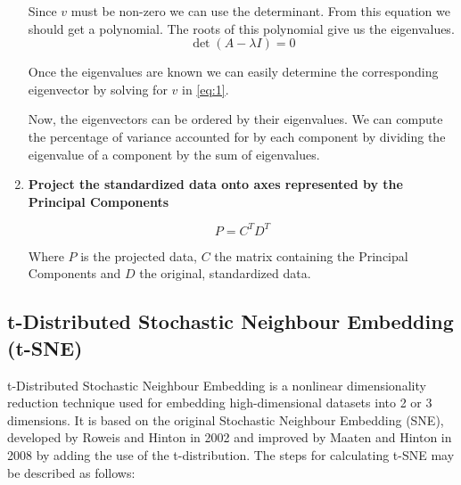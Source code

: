\documentclass[a4paper, 12pt, twoside]{report}
\begin{document}
\begin{enumerate}
    Since $v$ must be non-zero we can use the determinant. From this equation we should get a polynomial. The roots of this polynomial give us the eigenvalues.
    \[ \det(A - \lambda I) = 0 \]

    Once the eigenvalues are known we can easily determine the corresponding eigenvector by solving for $v$ in \ref{eq:1}.

    Now, the eigenvectors can be ordered by their eigenvalues. We can compute the percentage of variance accounted for by each component by dividing the eigenvalue of a component by the sum of eigenvalues.

\item \textbf{Project the standardized data onto axes represented by the Principal Components}

\[ P = C^{T}D^{T} \]

Where $P$ is the projected data, $C$ the matrix containing the Principal Components and $D$ the original, standardized data.
\end{enumerate}


\subsection{t-Distributed Stochastic Neighbour Embedding (t-SNE)}
\label{sec:orgadaa38f}

t-Distributed Stochastic Neighbour Embedding is a nonlinear dimensionality reduction technique used for embedding high-dimensional datasets into 2 or 3 dimensions. It is based on the original Stochastic Neighbour Embedding (SNE), developed by Roweis and Hinton \cite{sne} in 2002 and improved by Maaten and Hinton \cite{tsne} in 2008 by adding the use of the t-distribution. The steps for calculating t-SNE may be described as follows:
\end{document}
